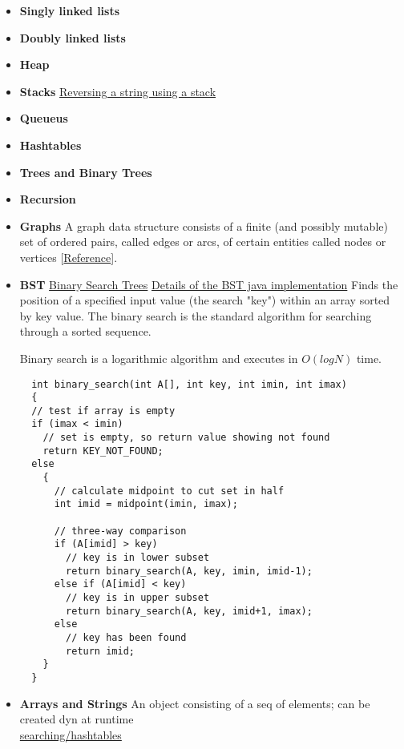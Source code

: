 \documentclass[letterpaper]{article}
\begin{document}
\begin{itemize}
\item{\bf Singly linked lists}
\item{\bf Doubly linked lists}
\item{\bf Heap}
\item{\bf Stacks}
  \subitem \href{http://www.tutorialspoint.com/javaexamples/data_reverse.htm}{Reversing a string using a stack}
\item{\bf Queueus}
\item{\bf Hashtables}
\item{\bf Trees and Binary Trees}

\item{\bf Recursion}
\item{\bf Graphs} A graph data structure consists of a finite (and possibly mutable) set of ordered pairs, called edges or arcs, of certain entities called nodes or vertices [\href{http://en.wikipedia.org/wiki/Graph_(abstract_data_type)}{Reference}]. 
\item{\bf BST}
  \subitem \href{http://algs4.cs.princeton.edu/32bst/}{Binary Search Trees}
  \subitem \href{http://www.cs.princeton.edu/~rs/AlgsDS07/08BinarySearchTrees.pdf}{Details of 
  the BST java implementation}
  Finds the position of a specified input value (the search "key") within an array sorted 
  by key value.  The binary search is the standard algorithm for searching through a sorted sequence.


\subitem	 Binary search is a logarithmic algorithm and executes in $O(log N)$ time. 
  \begin{lstlisting}
  int binary_search(int A[], int key, int imin, int imax)
  {
  // test if array is empty
  if (imax < imin)
    // set is empty, so return value showing not found
    return KEY_NOT_FOUND;
  else
    {
      // calculate midpoint to cut set in half
      int imid = midpoint(imin, imax);
 
      // three-way comparison
      if (A[imid] > key)
        // key is in lower subset
        return binary_search(A, key, imin, imid-1);
      else if (A[imid] < key)
        // key is in upper subset
        return binary_search(A, key, imid+1, imax);
      else
        // key has been found
        return imid;
    }
  }
  \end{lstlisting}


\item{\bf Arrays and Strings}
  An object consisting of a seq of elements; can be created dyn at runtime\\
\href{http://www.sparknotes.com/cs/searching/hashtables/section3.rhtml}{searching/hashtables}



\end{itemize}
\end{document}
